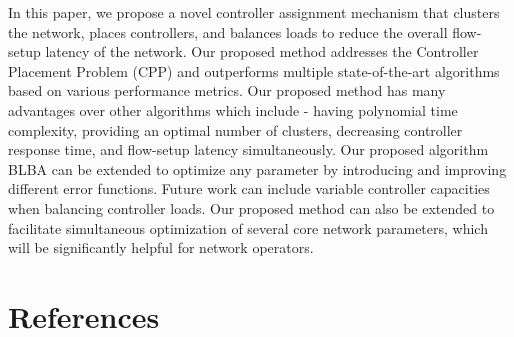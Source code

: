 \documentclass[final,5p,times]{cas-dc}
\begin{document}
	In this paper, we propose a novel controller assignment mechanism that clusters the network, places controllers, and balances loads to reduce the overall flow-setup latency of the network. Our proposed method addresses the Controller Placement Problem (CPP) and outperforms multiple state-of-the-art algorithms based on various performance metrics. Our proposed method has many advantages over other algorithms which include - having polynomial time complexity, providing an optimal number of clusters, decreasing controller response time, and flow-setup latency simultaneously. Our proposed algorithm BLBA can be extended to optimize any parameter by introducing and improving different error functions. Future work can include variable controller capacities when balancing controller loads. Our proposed method can also be extended to facilitate simultaneous optimization of several core network parameters, which will be significantly helpful for network operators.
	
	\section*{References}
	 
	
\end{document}
